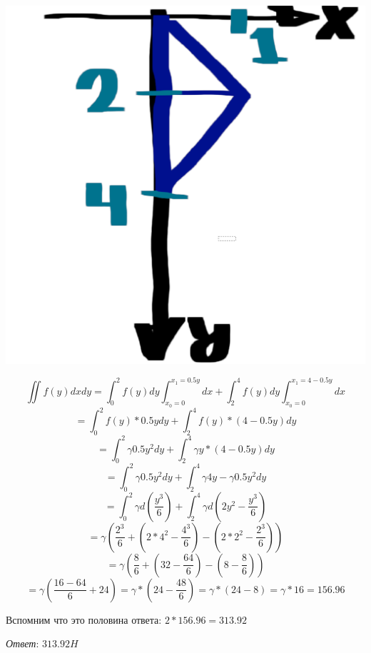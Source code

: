 \includegraphics[scale=0.2]{111.png}

$$\iint{f(y)}dxdy = \int_{0}^{2} f(y) dy \int_{x_0 = 0}^{x_1 = 0.5y} dx +
\int_{2}^{4} f(y) dy \int_{x_0 = 0}^{x_1 = 4-0.5y} dx$$
$$ = \int_{0}^{2} f(y)*0.5y dy  + \int_{2}^{4} f(y) * (4-0.5y) dy$$
$$ = \int_{0}^{2} \gamma 0.5y^2 dy  + \int_{2}^{4} \gamma y * (4 - 0.5y) dy$$
$$ = \int_{0}^{2} \gamma 0.5y^2 dy  + \int_{2}^{4} \gamma 4 y - \gamma 0.5y^2 dy$$
$$ = \int_{0}^{2} \gamma d(\frac{y^3}{6})  + \int_{2}^{4} \gamma d( 2 y^2 - \frac{y^3}{6} )$$
$$ = \gamma (\frac{2^3}{6} + ( 2* 4^2 - \frac{4^3}{6} ) - ( 2* 2^2 - \frac{2^3}{6} ) )$$
$$ = \gamma (\frac{8}{6} + ( 32 - \frac{64}{6} ) - ( 8 - \frac{8}{6} ) )$$
$$ = \gamma (\frac{16-64}{6} + 24 ) = \gamma *( 24 - \frac{48}{6}) =  \gamma * (24 - 8) =  \gamma * 16 = 156.96$$

Вспомним что это половина ответа: $2 * 156.96 = 313.92$

\textit{Ответ}: $313.92 H$
\clearpage
